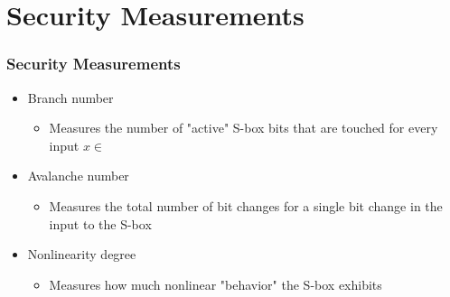 \documentclass[handout]{beamer}
\begin{document}
\section{Security Measurements}
\begin{frame}
	\frametitle{Security Measurements}
	\begin{itemize}
		\item Branch number
		\begin{itemize}
			\item Measures the number of "active" S-box bits that are touched for every input $x \in $
		\end{itemize}
		\item Avalanche number
		\begin{itemize}
			\item Measures the total number of bit changes for a single bit change in the input to the S-box
		\end{itemize}
		\item Nonlinearity degree
		\begin{itemize}
			\item Measures how much nonlinear "behavior" the S-box exhibits
		\end{itemize}
	\end{itemize}
\end{frame}
\end{document}
